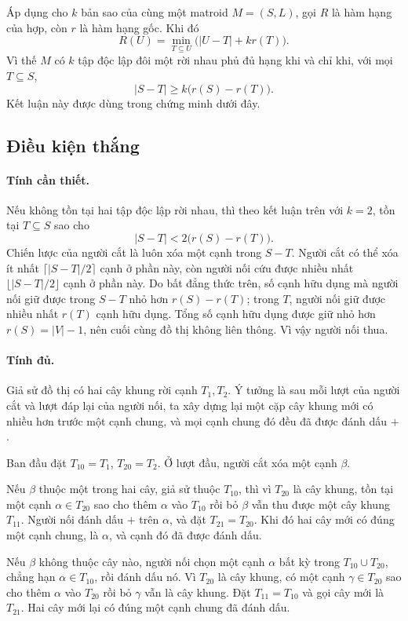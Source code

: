 \documentclass[11pt]{article}
\begin{document}
Áp dụng cho \(k\) bản sao của cùng một matroid \(M=(S,L)\), gọi \(R\) là hàm
hạng của hợp, còn \(r\) là hàm hạng gốc. Khi đó
\[
  R(U)=\min_{T\subseteq U}\bigl(|U-T|+k r(T)\bigr).
\]
Vì thế \(M\) có \(k\) tập độc lập đôi một rời nhau phủ đủ hạng khi và chỉ khi,
với mọi \(T\subseteq S\),
\[
  |S-T|\ge k\bigl(r(S)-r(T)\bigr).
\]
Kết luận này được dùng trong chứng minh dưới đây.

\subsection*{Điều kiện thắng}

\paragraph{Tính cần thiết.}
Nếu không tồn tại hai tập độc lập rời nhau, thì theo kết luận trên với \(k=2\),
tồn tại \(T\subseteq S\) sao cho
\[
  |S-T|<2\bigl(r(S)-r(T)\bigr).
\]
Chiến lược của người cắt là luôn xóa một cạnh trong \(S-T\). Người cắt có thể
xóa ít nhất \(\lceil |S-T|/2\rceil\) cạnh ở phần này, còn người nối cứu được
nhiều nhất \(\lfloor |S-T|/2\rfloor\) cạnh ở phần này. Do bất đẳng thức trên,
số cạnh hữu dụng mà người nối giữ được trong \(S-T\) nhỏ hơn \(r(S)-r(T)\);
trong \(T\), người nối giữ được nhiều nhất \(r(T)\) cạnh hữu dụng. Tổng số
cạnh hữu dụng được giữ nhỏ hơn \(r(S)=|V|-1\), nên cuối cùng đồ thị không liên
thông. Vì vậy người nối thua.

\paragraph{Tính đủ.}
Giả sử đồ thị có hai cây khung rời cạnh \(T_1,T_2\). Ý tưởng là sau mỗi lượt
của người cắt và lượt đáp lại của người nối, ta xây dựng lại một cặp cây
khung mới có nhiều hơn trước một cạnh chung, và mọi cạnh chung đó đều đã được
đánh dấu \(+\).

Ban đầu đặt \(T_{10}=T_1\), \(T_{20}=T_2\). Ở lượt đầu, người cắt xóa một cạnh
\(\beta\).

Nếu \(\beta\) thuộc một trong hai cây, giả sử thuộc \(T_{10}\), thì vì
\(T_{20}\) là cây khung, tồn tại một cạnh \(\alpha\in T_{20}\) sao cho thêm
\(\alpha\) vào \(T_{10}\) rồi bỏ \(\beta\) vẫn thu được một cây khung \(T_{11}\).
Người nối đánh dấu \(+\) trên \(\alpha\), và đặt \(T_{21}=T_{20}\). Khi đó hai
cây mới có đúng một cạnh chung, là \(\alpha\), và cạnh đó đã được đánh dấu.

Nếu \(\beta\) không thuộc cây nào, người nối chọn một cạnh \(\alpha\) bất kỳ
trong \(T_{10}\cup T_{20}\), chẳng hạn \(\alpha\in T_{10}\), rồi đánh dấu nó.
Vì \(T_{20}\) là cây khung, có một cạnh \(\gamma\in T_{20}\) sao cho thêm
\(\alpha\) vào \(T_{20}\) rồi bỏ \(\gamma\) vẫn là cây khung. Đặt
\(T_{11}=T_{10}\) và gọi cây mới là \(T_{21}\). Hai cây mới lại có đúng một
cạnh chung đã đánh dấu.
\end{document}
